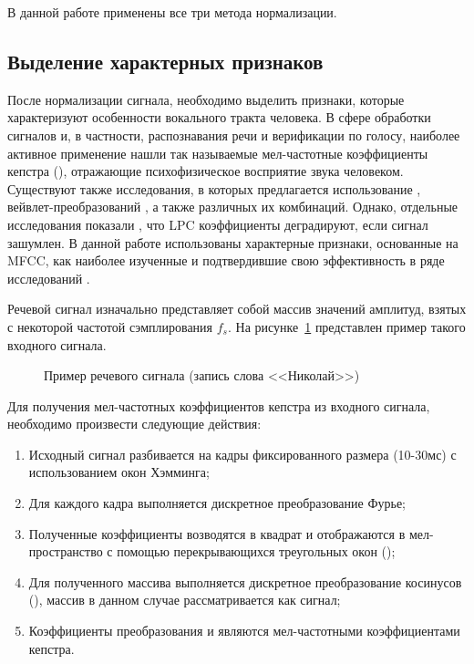 В данной работе применены все три метода нормализации.

\subsection{Выделение характерных признаков}

После нормализации сигнала, необходимо выделить признаки, которые характеризуют особенности вокального тракта человека. В сфере обработки сигналов и, в частности, распознавания речи и верификации по голосу, наиболее активное применение нашли так называемые мел-частотные коэффициенты кепстра (), отражающие психофизическое восприятие звука человеком. Существуют также исследования, в которых предлагается использование , вейвлет-преобразований \cite{Medvedev06wavelets}, а также различных их комбинаций. Однако, отдельные исследования показали \cite{Tierney80LPC}, что LPC коэффициенты деградируют, если сигнал зашумлен. В данной работе использованы характерные признаки, основанные на MFCC, как наиболее изученные и подтвердившие свою эффективность в ряде исследований \cite{Jayanna09overview}.

Речевой сигнал изначально представляет собой массив значений амплитуд, взятых с некоторой частотой сэмплирования $f_s$. На рисунке~\ref{fig:waveform} представлен пример такого входного сигнала.

\begin{figure}[h!]
\caption{Пример речевого сигнала (запись слова <<Николай>>)}
\label{fig:waveform}
\end{figure}

Для получения мел-частотных коэффициентов кепстра из входного сигнала, необходимо произвести следующие действия:

\begin{enumerate}
\item Исходный сигнал разбивается на кадры фиксированного размера (10-30мс) с использованием окон Хэмминга;
\item Для каждого кадра выполняется дискретное преобразование Фурье;
\item Полученные коэффициенты возводятся в квадрат и отображаются в мел-пространство с помощью перекрывающихся треугольных окон ();
\item Для полученного массива выполняется дискретное преобразование косинусов (), массив в данном случае рассматривается как сигнал;
\item Коэффициенты преобразования и являются мел-частотными коэффициентами кепстра.
\end{enumerate}

